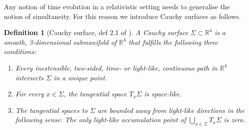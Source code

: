 \documentclass[b5paper,draft,openbib,12pt]{memoir}
\newtheorem{Def}{Definition}
\begin{document}
Any notion of time evolution in a relativistic setting needs to 
generalise the notion of simultaneity. For this reason we 
introduce Cauchy surfaces as follows.


\begin{Def}[Cauchy surface, def 2.1 of \cite{deckert2016perspective}]
  A Cauchy surface \(\Sigma\subset \mathbb{R}^4\) is a smooth, 
  3-dimensional submanifold of \(\mathbb{R}^4\) that fulfills
  the following three conditions:
  \begin{enumerate}[label=\alph*)]
  \item Every inextensible, two-sided, time- or light-like, continuous path in \(\mathbb{R}^4\) intersects \(\Sigma\) in a unique point.
  \item For every \(x\in\Sigma\), the tangential space \(T_x\Sigma\) is space-like.
  \item The tangential spaces to \(\Sigma\) are bounded away from light-like directions in the following sense: The only light-like accumulation point of 
  \(\bigcup_{x\in \Sigma} T_x \Sigma\) is zero.
  \end{enumerate}
\end{Def}
\end{document}
